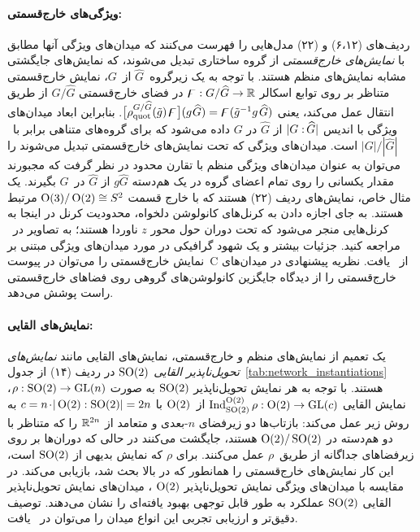\paragraph{ویژگی‌های خارج‌قسمتی:}
ردیف‌های (۶،۱۲) و (۲۲) مدل‌هایی را فهرست می‌کنند که میدان‌های ویژگی آنها مطابق با \emph{نمایش‌های خارج‌قسمتی} از گروه ساختاری تبدیل می‌شوند، که نمایش‌های جایگشتی مشابه نمایش‌های منظم هستند.
با توجه به یک زیرگروه~$\widehat{G}$ از~$G$، نمایش خارج‌قسمتی متناظر بر روی توابع اسکالر $\digamma: G/\widehat{G} \to \mathbb{R}$ در فضای خارج‌قسمتی $G/\widehat{G}$ از طریق انتقال عمل می‌کند، یعنی
$\big[\rho_\textup{quot}^{G/\widehat{G}} (\tilde{g})\mkern2mu \digamma\big] (g\mkern1mu \widehat{G}) = \digamma(\tilde{g}^{-1}g \mkern2mu \widehat{G})$.
بنابراین ابعاد میدان‌های ویژگی با اندیس ${|G:\mkern-2mu\widehat{G}|}$ از $\widehat{G}$ در $G$ داده می‌شود که برای گروه‌های متناهی برابر با~$|G|/|\widehat{G}|$ است.
میدان‌های ویژگی که تحت نمایش‌های خارج‌قسمتی تبدیل می‌شوند را می‌توان به عنوان میدان‌های ویژگی منظم با تقارن محدود در نظر گرفت که مجبورند مقدار یکسانی را روی تمام اعضای گروه در یک هم‌دسته $g\widehat{G}$ از $\widehat{G}$ در~$G$ بگیرند.
یک مثال خاص، نمایش‌های ردیف (۲۲) هستند که با خارج‌ قسمت $\operatorname{O}(3)/\operatorname{O}(2) \cong S^2$ مرتبط هستند.
به جای اجازه دادن به کرنل‌های کانولوشن دلخواه، محدودیت کرنل در اینجا به کرنل‌هایی منجر می‌شود که تحت دوران حول محور $z$ ناوردا هستند؛ به تصاویر در~\cite{janssen2018design} مراجعه کنید.
جزئیات بیشتر و یک شهود گرافیکی در مورد میدان‌های ویژگی مبتنی بر نمایش خارج‌قسمتی را می‌توان در پیوست~C از~\cite{Weiler2019_E2CNN} یافت.
نظریه پیشنهادی در \cite{Kondor2018-GENERAL} میدان‌های خارج‌قسمتی را از دیدگاه جایگزین کانولوشن‌های گروهی روی فضاهای خارج‌قسمتی راست پوشش می‌دهد.


\paragraph{نمایش‌های القایی:}
یک تعمیم از نمایش‌های منظم و خارج‌قسمتی، نمایش‌های القایی مانند \emph{نمایش‌های تحویل‌ناپذیر القایی $\operatorname{SO}(2)$} در ردیف (۱۴)
از جدول~\ref{tab:network_instantiations} هستند.
با توجه به هر نمایش تحویل‌ناپذیر $\operatorname{SO}(2)$ به صورت $\rho: \operatorname{SO}(2) \to \operatorname{GL}(n)$، نمایش القایی $\operatorname{Ind}_{\operatorname{SO}(2)}^{\operatorname{O}(2)}\rho: \operatorname{O}(2) \to \operatorname{GL}(c)$ از~$\operatorname{O}(2)$ با $c = n \mkern-2mu\cdot\! {|\operatorname{O}(2):\operatorname{SO}(2)|} = 2n$
به روش زیر عمل می‌کند:
بازتاب‌ها دو زیرفضای $n$-بعدی و متعامد از $\mathbb{R}^{2n}$ را که متناظر با دو هم‌دسته در $\operatorname{O}(2)/\operatorname{SO}(2)$ هستند، جایگشت می‌کنند در حالی که دوران‌ها بر روی زیرفضاهای جداگانه از طریق~$\rho$ عمل می‌کنند.
برای $\rho$ که نمایش بدیهی از $\operatorname{SO}(2)$ است، این کار نمایش‌های خارج‌قسمتی را همانطور که در بالا بحث شد، بازیابی می‌کند.
در مقایسه با میدان‌های ویژگی نمایش تحویل‌ناپذیر $\operatorname{O}(2)$ ، میدان‌های نمایش تحویل‌ناپذیر القایی $\operatorname{SO}(2)$ عملکرد به طور قابل توجهی بهبود یافته‌ای را نشان می‌دهند.
توصیف دقیق‌تر و ارزیابی تجربی این انواع میدان را می‌توان در~\cite{Weiler2019_E2CNN} یافت.


